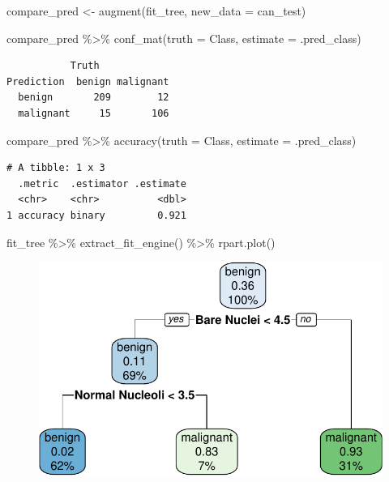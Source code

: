 \documentclass[
  letterpaper,
  DIV=11,
  numbers=noendperiod]{scrreprt}
\newenvironment{Shaded}{\begin{snugshade}}{\end{snugshade}}
\newcommand{\AttributeTok}[1]{\textcolor[rgb]{0.40,0.45,0.13}{#1}}
\newcommand{\FunctionTok}[1]{\textcolor[rgb]{0.28,0.35,0.67}{#1}}
\newcommand{\NormalTok}[1]{\textcolor[rgb]{0.00,0.23,0.31}{#1}}
\newcommand{\OtherTok}[1]{\textcolor[rgb]{0.00,0.23,0.31}{#1}}
\newcommand{\SpecialCharTok}[1]{\textcolor[rgb]{0.37,0.37,0.37}{#1}}
\begin{document}
\begin{Shaded}
\begin{Highlighting}[]
\NormalTok{compare\_pred }\OtherTok{\textless{}{-}} \FunctionTok{augment}\NormalTok{(fit\_tree, }\AttributeTok{new\_data =}\NormalTok{ can\_test) }

\NormalTok{compare\_pred }\SpecialCharTok{\%\textgreater{}\%} \FunctionTok{conf\_mat}\NormalTok{(}\AttributeTok{truth =}\NormalTok{ Class, }\AttributeTok{estimate =}\NormalTok{ .pred\_class)}
\end{Highlighting}
\end{Shaded}

\begin{verbatim}
           Truth
Prediction  benign malignant
  benign       209        12
  malignant     15       106
\end{verbatim}

\begin{Shaded}
\begin{Highlighting}[]
\NormalTok{compare\_pred }\SpecialCharTok{\%\textgreater{}\%}  \FunctionTok{accuracy}\NormalTok{(}\AttributeTok{truth =}\NormalTok{ Class, }\AttributeTok{estimate =}\NormalTok{ .pred\_class)}
\end{Highlighting}
\end{Shaded}

\begin{verbatim}
# A tibble: 1 x 3
  .metric  .estimator .estimate
  <chr>    <chr>          <dbl>
1 accuracy binary         0.921
\end{verbatim}

\begin{Shaded}
\begin{Highlighting}[]
\NormalTok{fit\_tree }\SpecialCharTok{\%\textgreater{}\%}
  \FunctionTok{extract\_fit\_engine}\NormalTok{() }\SpecialCharTok{\%\textgreater{}\%}
  \FunctionTok{rpart.plot}\NormalTok{()}
\end{Highlighting}
\end{Shaded}

\begin{figure}[H]

{\centering \includegraphics{./14-machine-learning_files/figure-pdf/unnamed-chunk-13-1.pdf}

}

\end{figure}
\end{document}
